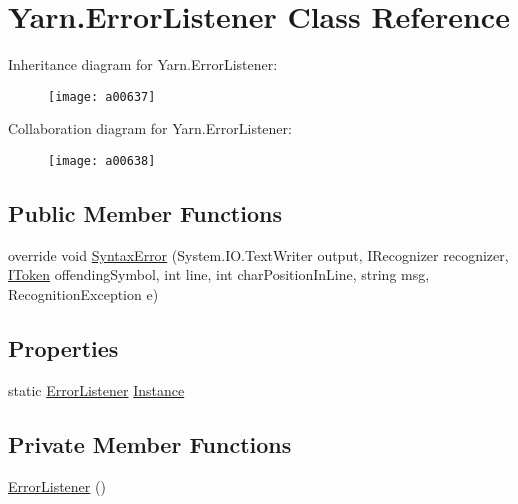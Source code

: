 \hypertarget{a00100}{\section{Yarn.\-Error\-Listener Class Reference}
\label{a00100}
}


Inheritance diagram for Yarn.\-Error\-Listener\-:
\nopagebreak
\begin{figure}[H]
\begin{center}
\leavevmode
\texttt{[image: a00637]}
\end{center}
\end{figure}


Collaboration diagram for Yarn.\-Error\-Listener\-:
\nopagebreak
\begin{figure}[H]
\begin{center}
\leavevmode
\texttt{[image: a00638]}
\end{center}
\end{figure}
\subsection*{Public Member Functions}
\begin{DoxyCompactItemize}
\item 
override void \hyperlink{a00100_a47fb9f6d50aa6a4e4796dea10b237fe4}{Syntax\-Error} (System.\-I\-O.\-Text\-Writer output, I\-Recognizer recognizer, \hyperlink{a00319_ae3d87b0b748ea892bff48f60862e182d}{I\-Token} offending\-Symbol, int line, int char\-Position\-In\-Line, string msg, Recognition\-Exception e)
\end{DoxyCompactItemize}
\subsection*{Properties}
\begin{DoxyCompactItemize}
\item 
static \hyperlink{a00100}{Error\-Listener} \hyperlink{a00100_a47b8f4f1d414afa1ea6067218c7ee34d}{Instance}
\end{DoxyCompactItemize}
\subsection*{Private Member Functions}
\begin{DoxyCompactItemize}
\item 
\hyperlink{a00100_a1f0cc41aac10bd8a2402355534c1123c}{Error\-Listener} ()
\end{DoxyCompactItemize}
